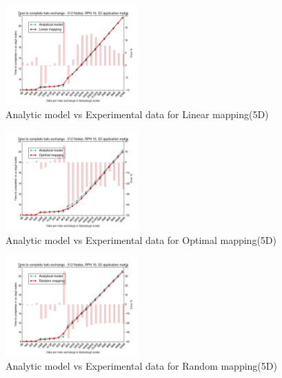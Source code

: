 \documentclass{acm_proc_article-sp}
\begin{document}



\begin{figure}
  \center
  \includegraphics[width=0.45\textwidth]{mappings/5d_linear_model.png}
  \caption{Analytic model vs Experimental data for Linear mapping(5D)}
    \label{fig:5D_linear_mapping}
\end{figure}


\begin{figure}
  \center
  \includegraphics[width=0.45\textwidth]{mappings/5d_optimal_model.png}
  \caption{Analytic model vs Experimental data for Optimal mapping(5D)}
    \label{fig:5D_optimal_mapping}
\end{figure}

\begin{figure}
  \center
  \includegraphics[width=0.45\textwidth]{mappings/5d_random_model.png}
  \caption{Analytic model vs Experimental data for Random mapping(5D)}
    \label{fig:5D_random_mapping}
\end{figure}
\end{document}

